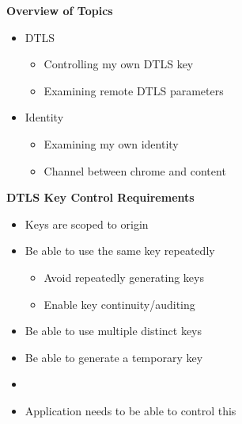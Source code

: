\documentclass[helvetica]{seminar}
\newcommand{\heading}[1]{%
  \begin{center} 
    \large\bf 
    #1 
  \end{center} 
  \vspace{.4 in}}
\begin{document}
\begin{slide}
\begin{center}
\vspace{1 in}
\vspace{.2in}
\large{{Identity, Security, etc. API Issues}} \\
\vspace{3em}
\begin{tabular}{c}
Eric Rescorla \\
\url{ekr@rtfm.com}
\end{tabular}
}
\end{center}

\end{slide}


\centerslidesfalse 


\begin{slide}
\heading{Overview of Topics}

\begin{itemize}
\item DTLS
\begin{itemize}
  \item Controlling my own DTLS key
  \item Examining remote DTLS parameters
\end{itemize}

\item Identity
  \begin{itemize}
  \item Examining my own identity
  \item Channel between chrome and content
  \end{itemize}
\end{itemize}
\end{slide}


\begin{slide}
\heading{DTLS Key Control Requirements}

\begin{itemize}
\item Keys are scoped to origin
\item Be able to use the same key repeatedly
  \begin{itemize}
  \item Avoid repeatedly generating keys
  \item Enable key continuity/auditing
  \end{itemize}

\item Be able to use multiple distinct keys
\item Be able to generate a temporary key
\item[]
\item Application needs to be able to control this
\end{itemize}
\end{slide}
\end{document}
